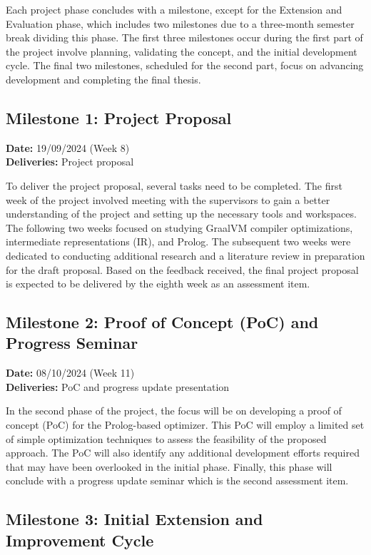 \newpage
Each project phase concludes with a milestone, except for the Extension and Evaluation phase, which includes two milestones due to a three-month semester break dividing this phase. The first three milestones occur during the first part of the project involve planning, validating the concept, and the initial development cycle. The final two milestones, scheduled for the second part, focus on advancing development and completing the final thesis.

\subsection{Milestone 1: Project Proposal}
\textbf{Date:} 19/09/2024 (Week 8) \\
\textbf{Deliveries:} Project proposal

To deliver the project proposal, several tasks need to be completed. The first week of the project involved meeting with the supervisors to gain a better understanding of the project and setting up the necessary tools and workspaces. The following two weeks focused on studying GraalVM compiler optimizations, intermediate representations (IR), and Prolog. The subsequent two weeks were dedicated to conducting additional research and a literature review in preparation for the draft proposal. Based on the feedback received, the final project proposal is expected to be delivered by the eighth week as an assessment item.

\subsection{Milestone 2: Proof of Concept (PoC) and Progress Seminar}

\textbf{Date:} 08/10/2024 (Week 11) \\
\textbf{Deliveries:} PoC and progress update presentation

In the second phase of the project, the focus will be on developing a proof of concept (PoC) for the Prolog-based optimizer. This PoC will employ a limited set of simple optimization techniques to assess the feasibility of the proposed approach. The PoC will also identify any additional development efforts required that may have been overlooked in the initial phase. Finally, this phase will conclude with a progress update seminar which is the second assessment item.

\subsection{Milestone 3: Initial Extension and Improvement Cycle}

